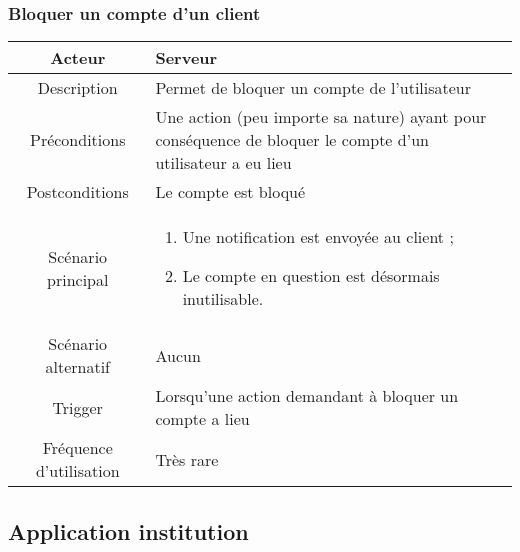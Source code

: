 \documentclass{article}
\begin{document}
\subsubsection{Bloquer un compte d'un client}
\begin{table}[h!]

\begin{tabular}{|c|p{11cm}|}
\hline
Acteur & Serveur \\
\hline
Description & Permet de bloquer un compte de l'utilisateur \\
\hline
Préconditions & Une action (peu importe sa nature) ayant pour conséquence de bloquer le compte d'un utilisateur a eu lieu \\
\hline
Postconditions & Le compte est bloqué \\
\hline
Scénario principal & \begin{enumerate}
\item Une notification est envoyée au client ;
\item Le compte en question est désormais inutilisable.
\end{enumerate} \\
\hline
Scénario alternatif & Aucun \\
\hline
Trigger & Lorsqu'une action demandant à bloquer un compte a lieu \\
\hline
Fréquence d'utilisation & Très rare \\
\hline
\end{tabular}

\end{table}


\newpage


\subsection{Application institution}
\end{document}
